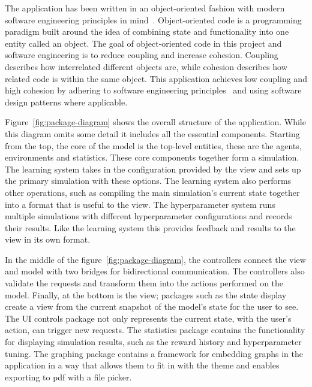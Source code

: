 \documentclass[]{final_report}
\begin{document}
The application has been written in an object-oriented fashion with modern software engineering principles in mind~\cite{van2008software}. Object-oriented code is a programming paradigm built around the idea of combining state and functionality into one entity called an object. The goal of object-oriented code in this project and software engineering is to reduce coupling and increase cohesion. Coupling describes how interrelated different objects are, while cohesion describes how related code is within the same object. This application achieves low coupling and high cohesion by adhering to software engineering principles~\cite{softwareEngineringPrinciples} and using software design patterns where applicable.

Figure~\ref{fig:package-diagram} shows the overall structure of the application. While this diagram omits some detail it includes all the essential components. Starting from the top, the core of the model is the top-level entities, these are the agents, environments and statistics. These core components together form a simulation. The learning system takes in the configuration provided by the view and sets up the primary simulation with these options. The learning system also performs other operations, such as compiling the main simulation's current state together into a format that is useful to the view. The hyperparameter system runs multiple simulations with different hyperparameter configurations and records their results. Like the learning system this provides feedback and results to the view in its own format.

In the middle of the figure~\ref{fig:package-diagram}, the controllers connect the view and model with two bridges for bidirectional communication. The controllers also validate the requests and transform them into the actions performed on the model. Finally, at the bottom is the view; packages such as the state display create a view from the current snapshot of the model's state for the user to see. The UI controls package not only represents the current state, with the user's action, can trigger new requests. The statistics package contains the functionality for displaying simulation results, such as the reward history and hyperparameter tuning. The graphing package contains a framework for embedding graphs in the application in a way that allows them to fit in with the theme and enables exporting to pdf with a file picker.
\end{document}
